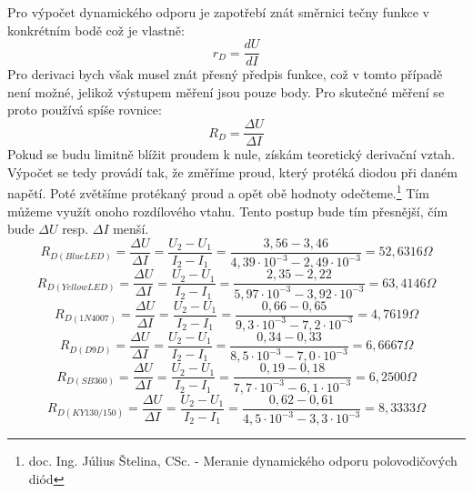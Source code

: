 \documentclass[12pt]{article} %
\begin{document}
Pro výpočet dynamického odporu je zapotřebí znát směrnici tečny funkce v konkrétním bodě což je vlastně:
\begin{equation}
r_D=\frac{dU}{dI}
\end{equation}
Pro derivaci bych však musel znát přesný předpis funkce, což v tomto případě není možné, jelikož výstupem měření jsou pouze body. Pro skutečné měření se proto používá spíše rovnice:
\begin{equation}
R_D=\frac{\Delta U}{\Delta I}
\end{equation}
Pokud se budu limitně blížit proudem k nule, získám teoretický derivační vztah. Výpočet se tedy provádí tak, že změříme proud, který protéká diodou při daném napětí. Poté zvětšíme protékaný proud a opět obě hodnoty odečteme.\footnote{doc. Ing. Július Štelina, CSc. - Meranie dynamického odporu polovodičových diód}  Tím můžeme využít onoho rozdílového vtahu. Tento postup bude tím přesnější, čím bude $\Delta U$ resp. $\Delta I$ menší.
\begin{equation}
R_{D(BlueLED)}=\frac{\Delta U}{\Delta I}=\frac{U_2-U_1}{I_2-I_1}=\frac{3,56-3,46}{4,39\cdot 10^{-3}-2,49\cdot 10^{-3}}=52,6316\Omega
\end{equation}
\begin{equation}
R_{D(YellowLED)}=\frac{\Delta U}{\Delta I}=\frac{U_2-U_1}{I_2-I_1}=\frac{2,35-2,22}{5,97\cdot 10^{-3}-3,92\cdot 10^{-3}}=63,4146\Omega
\end{equation}
\begin{equation}
R_{D(1N4007)}=\frac{\Delta U}{\Delta I}=\frac{U_2-U_1}{I_2-I_1}=\frac{0,66-0,65}{9,3\cdot 10^{-3}-7,2\cdot 10^{-3}}=4,7619\Omega
\end{equation}
\begin{equation}
R_{D(D9D)}=\frac{\Delta U}{\Delta I}=\frac{U_2-U_1}{I_2-I_1}=\frac{0,34-0,33}{8,5\cdot 10^{-3}-7,0\cdot 10^{-3}}=6,6667\Omega
\end{equation}
\begin{equation}
R_{D(SB 360)}=\frac{\Delta U}{\Delta I}=\frac{U_2-U_1}{I_2-I_1}=\frac{0,19-0,18}{7,7\cdot 10^{-3}-6,1\cdot 10^{-3}}=6,2500\Omega
\end{equation}
\begin{equation}
R_{D(KY 130/150)}=\frac{\Delta U}{\Delta I}=\frac{U_2-U_1}{I_2-I_1}=\frac{0,62-0,61}{4,5\cdot 10^{-3}-3,3\cdot 10^{-3}}=8,3333\Omega
\end{equation}
\end{document}
